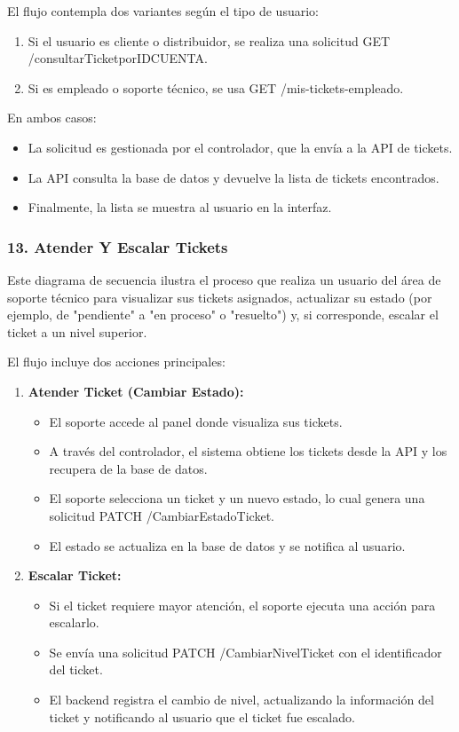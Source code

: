 El flujo contempla dos variantes según el tipo de usuario:

\begin{enumerate}
    \item Si el usuario es cliente o distribuidor, se realiza una solicitud GET /consultarTicketporIDCUENTA.
    \item Si es empleado o soporte técnico, se usa GET /mis-tickets-empleado.
\end{enumerate}

En ambos casos:

\begin{itemize}
    \item La solicitud es gestionada por el controlador, que la envía a la API de tickets.
    \item La API consulta la base de datos y devuelve la lista de tickets encontrados.
    \item Finalmente, la lista se muestra al usuario en la interfaz.
\end{itemize}

\subsubsection*{13. Atender Y Escalar Tickets}

Este diagrama de secuencia ilustra el proceso que realiza un usuario del área de soporte técnico para visualizar sus tickets asignados, actualizar su estado (por ejemplo, de "pendiente" a "en proceso" o "resuelto") y, si corresponde, escalar el ticket a un nivel superior.

El flujo incluye dos acciones principales:

\begin{enumerate}
\item \textbf{Atender Ticket (Cambiar Estado):}
\begin{itemize}
    \item El soporte accede al panel donde visualiza sus tickets.
    \item A través del controlador, el sistema obtiene los tickets desde la API y los recupera de la base de datos.
    \item El soporte selecciona un ticket y un nuevo estado, lo cual genera una solicitud PATCH /CambiarEstadoTicket.
    \item El estado se actualiza en la base de datos y se notifica al usuario.
\end{itemize}

\item \textbf{Escalar Ticket:}
\begin{itemize}
\item Si el ticket requiere mayor atención, el soporte ejecuta una acción para escalarlo.
\item Se envía una solicitud PATCH /CambiarNivelTicket con el identificador del ticket.
\item El backend registra el cambio de nivel, actualizando la información del ticket y notificando al usuario que el ticket fue escalado.
\end{itemize}
\end{enumerate}

